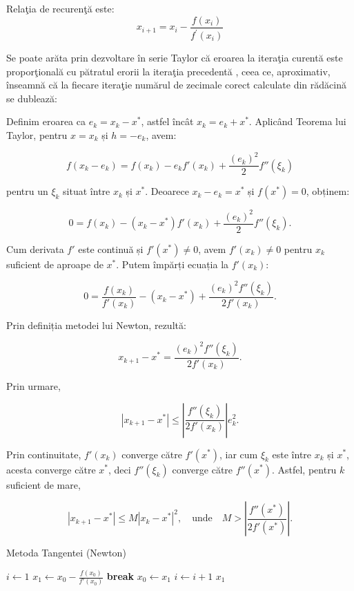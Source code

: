 \documentclass{exam}
\begin{document}
Relaţia de recurenţă este:
$$x_{i+1}=x_{i}-\frac{f(x_{i})}{f^{'}(x_{i})}$$

Se poate arăta prin dezvoltare în serie Taylor că eroarea la iteraţia curentă este proporţională cu pătratul erorii la iteraţia precedentă \cite{Quad}, ceea ce, aproximativ, înseamnă că la fiecare iteraţie numărul de zecimale corect calculate din rădăcină se dublează:

Definim eroarea ca $e_k = x_k - x^*$, astfel încât $x_k = e_k + x^*$. Aplicând Teorema lui Taylor, pentru $x = x_k$ și $h = -e_k$, avem:

$$ f(x_k - e_k) = f(x_k) - e_k f'(x_k) + \frac{(e_k)^2}{2} f''(\xi_k) $$

pentru un $\xi_k$ situat între $x_k$ și $x^*$. Deoarece $x_k - e_k = x^*$ și $f(x^*) = 0$, obținem:

$$ 0 = f(x_k) - (x_k - x^*) f'(x_k) + \frac{(e_k)^2}{2} f''(\xi_k). $$

Cum derivata $f'$ este continuă și $f'(x^*) \neq 0$, avem $f'(x_k) \neq 0$ pentru $x_k$ suficient de aproape de $x^*$. Putem împărți ecuația la $f'(x_k)$:

$$ 0 = \frac{f(x_k)}{f'(x_k)} - (x_k - x^*) + \frac{(e_k)^2 f''(\xi_k)}{2 f'(x_k)}. $$

Prin definiția metodei lui Newton, rezultă:

$$ x_{k+1} - x^* = \frac{(e_k)^2 f''(\xi_k)}{2 f'(x_k)}. $$

Prin urmare,

$$ |x_{k+1} - x^*| \leq \left| \frac{f''(\xi_k)}{2 f'(x_k)} \right| e_k^2. $$

Prin continuitate, $f'(x_k)$ converge către $f'(x^*)$, iar cum $\xi_k$ este între $x_k$ și $x^*$, acesta converge către $x^*$, deci $f''(\xi_k)$ converge către $f''(x^*)$. Astfel, pentru $k$ suficient de mare,

$$ |x_{k+1} - x^*| \leq M |x_k - x^*|^2, \quad \text{unde} \quad M > \left| \frac{f''(x^*)}{2 f'(x^*)} \right|. $$

\begin{algorithm}[H]
    \caption{Metoda Tangentei (Newton)}
    \begin{algorithmic}[1]
        \State $i \gets 1$
            \State $x_1 \gets x_0 - \frac{f(x_0)}{f'(x_0)}$
                \State \textbf{break}
            \EndIf
            \State $x_0 \gets x_1$
            \State $i \gets i + 1$
        \EndWhile
        \State \Return $x_1$
    \end{algorithmic}
\end{algorithm}
\end{document}
